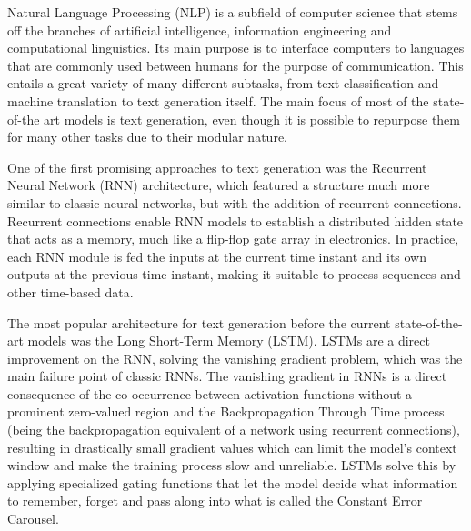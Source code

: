 



Natural Language Processing (NLP) is a subfield of computer science that stems off the branches of artificial intelligence, information engineering and computational linguistics.
Its main purpose is to interface computers to languages that are commonly used between humans for the purpose of communication.
This entails a great variety of many different subtasks, from text classification and machine translation to text generation itself.
The main focus of most of the state-of-the art models is text generation, even though it is possible to repurpose them for many other tasks due to their modular nature.

One of the first promising approaches to text generation was the Recurrent Neural Network (RNN) architecture, which featured a structure much more similar to classic neural networks, but with the addition of recurrent connections.
Recurrent connections enable RNN models to establish a distributed hidden state that acts as a memory, much like a flip-flop gate array in electronics.
In practice, each RNN module is fed the inputs at the current time instant and its own outputs at the previous time instant, making it suitable to process sequences and other time-based data.

\begin{figure}[t!]
    \centering
    \quad
    \caption{}
    \label{fig:background_rnn_lstm}
\end{figure}

The most popular architecture for text generation before the current state-of-the-art models was the Long Short-Term Memory (LSTM).
LSTMs are a direct improvement on the RNN, solving the vanishing gradient problem, which was the main failure point of classic RNNs.
The  vanishing gradient in RNNs is a direct consequence of the co-occurrence between activation functions without a prominent zero-valued region and the Backpropagation Through Time process (being the backpropagation equivalent of a network using recurrent connections), resulting in drastically small gradient values which can limit the model's context window and make the training process slow and unreliable.
LSTMs solve this by applying specialized gating functions that let the model decide what information to remember, forget and pass along into what is called the Constant Error Carousel.

